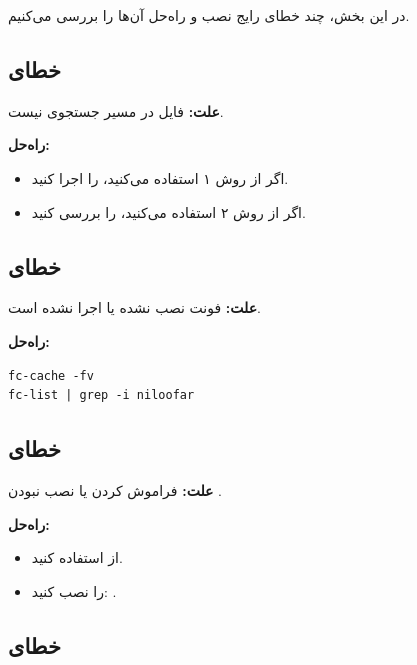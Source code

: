 در این بخش، چند خطای رایج نصب و راه‌حل آن‌ها
را بررسی می‌کنیم.

\subsection{خطای }
\label{sec:installation-error-cls}

\textbf{علت:} فایل  در مسیر
جستجوی  نیست.

\textbf{راه‌حل:}
\begin{itemize}
    \item اگر از روش ۱ استفاده می‌کنید،
     را اجرا کنید.
    \item اگر از روش ۲ استفاده می‌کنید،
     را بررسی کنید.
\end{itemize}

\subsection{خطای }
\label{sec:installation-error-font}

\textbf{علت:} فونت نصب نشده یا 
اجرا نشده است.

\textbf{راه‌حل:}
\begin{latin}
\begin{verbatim}
fc-cache -fv
fc-list | grep -i niloofar
\end{verbatim}
\end{latin}

\subsection{خطای }
\label{sec:installation-error-minted}

\textbf{علت:} فراموش کردن 
یا نصب نبودن .

\textbf{راه‌حل:}
\begin{itemize}
    \item از  استفاده کنید.
    \item {} را نصب کنید:
    .
\end{itemize}

\subsection{خطای }
\label{sec:installation-error-xindy}

